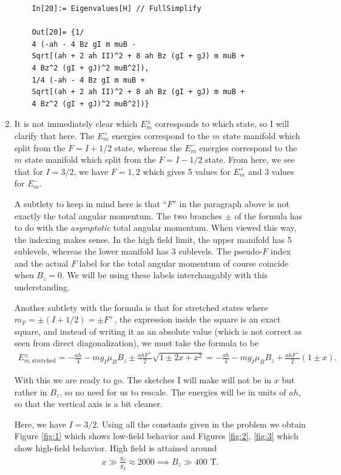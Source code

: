 \documentclass{article}
\theoremstyle{definition}
\newcommand{\f}[2]{\frac{#1}{#2}}
\begin{document}
\begin{enumerate}[label=(\alph*)]
\begin{lstlisting}
	In[20]:= Eigenvalues[H] // FullSimplify
	
	Out[20]= {1/
	4 (-ah - 4 Bz gI m muB - 
	Sqrt[(ah + 2 ah II)^2 + 8 ah Bz (gI + gJ) m muB + 
	4 Bz^2 (gI + gJ)^2 muB^2]), 
	1/4 (-ah - 4 Bz gI m muB + 
	Sqrt[(ah + 2 ah II)^2 + 8 ah Bz (gI + gJ) m muB + 
	4 Bz^2 (gI + gJ)^2 muB^2])}
	\end{lstlisting}
	
	\item It is not immediately clear which $E^\pm_m$ corresponds to which state, so I will clarify that here. The $E^+_m$ energies correspond to the $m$ state manifold which split from the $F=I+1/2$ state, whereas the $E^-_m$ energies correspond to the $m$ state manifold which split from the $F=I-1/2$ state. From here, we see that for $I=3/2$, we have $F=1,2$ which gives 5 values for $E^+_m$ and 3 values for $E^-_m$. 
	
	A subtlety to keep in mind here is that ``$F$'' in the paragraph above is not exactly the total angular momentum. The two branches $\pm$ of the formula has to do with the \textit{asymptotic} total angular momentum. When viewed this way, the indexing makes sense. In the high field limit, the upper manifold has 5 sublevels, whereas the lower manifold has 3 sublevels. The pseudo-$F$ index and the actual $F$ label for the total angular momentum of course coincide when $B_z =0$. We will be using these labels interchangably with this understanding. 
	
	Another subtlety with the formula is that for stretched states where $m_F = \pm (I+1/2) = \pm F^+$, the expression inside the square is an exact square, and instead of writing it as an absolute value (which is not correct as seen from direct diagonalization), we must take the formula to be 
	\begin{align*}
	E^\pm_{m,\text{stretched}} = -\f{ah}{4}-mg_I \mu_B B_z \pm \f{ah F^+}{2}\sqrt{1\pm 2x+x^2} = -\f{ah}{4}-mg_I \mu_B B_z + \f{ah F^+}{2}(1\pm x).
	\end{align*}
	
	With this we are ready to go. The sketches I will make will not be in $x$ but rather in $B_z$, so no need for us to rescale. The energies will be in units of $ah$, so that the vertical axis is a bit cleaner. 
	
	
	Here, we have $I=3/2$. Using all the constants given in the problem we obtain Figure \ref{fig:1} which shows low-field behavior and Figures \ref{fig:2}, \ref{fig:3} which show high-field behavior. High field is attained around 
	\begin{align*}
	x \gg \f{g_J}{g_I} \approx 2000 \implies B_z \gg 400 \text{ T}.
	\end{align*}
	

\end{enumerate}
\end{document}
